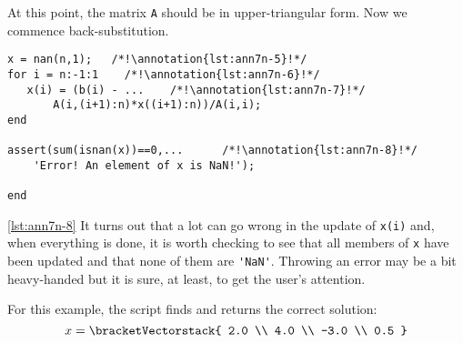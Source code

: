At this point, the matrix \lstinline[style=myMatlab]{A} should be in upper-triangular form.  Now we commence back-substitution.
\begin{lstlisting}[style=myMatlab,name=lec7n-ex1]
% back substitution phase
x = nan(n,1);   /*!\annotation{lst:ann7n-5}!*/
for i = n:-1:1    /*!\annotation{lst:ann7n-6}!*/
   x(i) = (b(i) - ...    /*!\annotation{lst:ann7n-7}!*/
       A(i,(i+1):n)*x((i+1):n))/A(i,i);    
end

assert(sum(isnan(x))==0,...      /*!\annotation{lst:ann7n-8}!*/
    'Error! An element of x is NaN!');

end
\end{lstlisting}

\vspace{0.1cm}

\noindent \ref{lst:ann7n-8} It turns out that a lot can go wrong in the update of \lstinline[style=myMatlab]{x(i)} and, when everything is done, it is worth checking to see that all members of \lstinline[style=myMatlab]{x} have been updated and that none of them are \lstinline[style=myMatlab]{'NaN'}.  Throwing an error may be a bit heavy-handed but it is sure, at least, to get the user's attention.

For this example, the script finds and returns the correct solution: 
\begin{equation*}
x = 
\bracketVectorstack{
2.0 \\
4.0 \\
-3.0 \\
0.5
}
\end{equation*}

